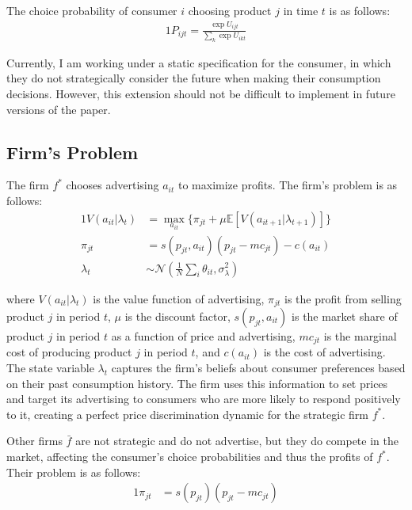 \documentclass[12pt]{article}
\begin{document}
    The choice probability of consumer $i$ choosing product $j$ in time $t$ is as follows:
    \begin{alignat*}{1}
      P_{ijt} = \frac{\exp{U_{ijt}}}{\sum_k\exp{U_{ikt}}}
    \end{alignat*}

    Currently, I am working under a static specification for the consumer, in which they do not strategically consider the future when making their consumption decisions. However, this extension should not be difficult to implement in future versions of the paper.

    \subsection{Firm's Problem}

    The firm $f^*$ chooses advertising $a_{it}$ to maximize profits. The firm's problem is as follows:
    \begin{alignat*}{1}
      V(a_{it} | \lambda_t) &= \max_{a_{it}} \{\pi_{jt} + \mu \mathbb{E}[V(a_{it+1} | \lambda_{t+1})]\} \\
      \pi_{jt} &= s(p_{jt}, a_{it})(p_{jt} - mc_{jt}) - c(a_{it}) \\
      \lambda_t &\sim \mathcal{N}(\frac{1}{N}\sum_i \theta_{it}, \sigma^2_\lambda)
    \end{alignat*}

      where $V(a_{it} | \lambda_t)$ is the value function of advertising, $\pi_{jt}$ is the profit from selling product $j$ in period $t$, $\mu$ is the discount factor, $s(p_{jt}, a_{it})$ is the market share of product $j$ in period $t$ as a function of price and advertising, $mc_{jt}$ is the marginal cost of producing product $j$ in period $t$, and $c(a_{it})$ is the cost of advertising. The state variable $\lambda_t$ captures the firm's beliefs about consumer preferences based on their past consumption history. The firm uses this information to set prices and target its advertising to consumers who are more likely to respond positively to it, creating a perfect price discrimination dynamic for the strategic firm $f^*$. 

    Other firms $\bar{f}$ are not strategic and do not advertise, but they do compete in the market, affecting the consumer's choice probabilities and thus the profits of $f^*$. Their problem is as follows:
    \begin{alignat*}{1}
      \pi_{jt} &= s(p_{jt})(p_{jt} - mc_{jt})
    \end{alignat*}
\end{document}
